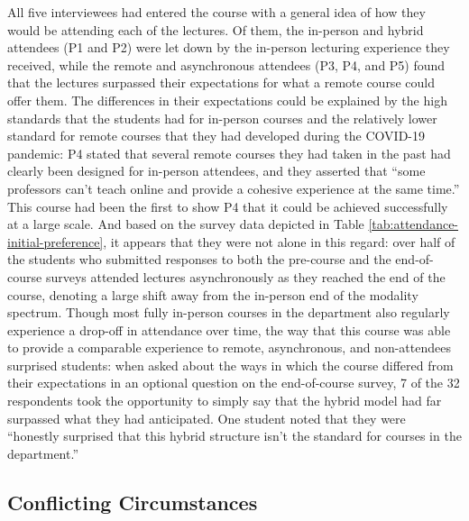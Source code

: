 All five interviewees had entered the course with a general idea of how they would be attending each of the lectures. Of them, the in-person and hybrid attendees (P1 and P2) were let down by the in-person lecturing experience they received, while the remote and asynchronous attendees (P3, P4, and P5) found that the lectures surpassed their expectations for what a remote course could offer them. The differences in their expectations could be explained by the high standards that the students had for in-person courses and the relatively lower standard for remote courses that they had developed during the COVID-19 pandemic: P4 stated that several remote courses they had taken in the past had clearly been designed for in-person attendees, and they asserted that “some professors can’t teach online and provide a cohesive experience at the same time.” This course had been the first to show P4 that it could be achieved successfully at a large scale. And based on the survey data depicted in Table \ref{tab:attendance-initial-preference}, it appears that they were not alone in this regard: over half of the students who submitted responses to both the pre-course and the end-of-course surveys attended lectures asynchronously as they reached the end of the course, denoting a large shift away from the in-person end of the modality spectrum. Though most fully in-person courses in the department also regularly experience a drop-off in attendance over time, the way that this course was able to provide a comparable experience to remote, asynchronous, and non-attendees surprised students: when asked about the ways in which the course differed from their expectations in an optional question on the end-of-course survey, 7 of the 32 respondents took the opportunity to simply say that the hybrid model had far surpassed what they had anticipated. One student noted that they were “honestly surprised that this hybrid structure isn't the standard for courses in the department.”

\subsection{Conflicting Circumstances}


